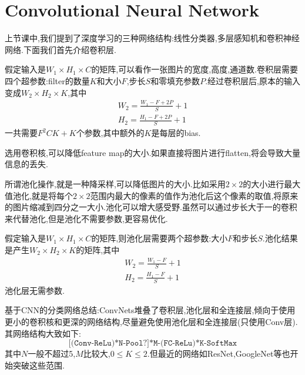 \section{Convolutional Neural Network}
上节课中,我们提到了深度学习的三种网络结构:线性分类器,多层感知机和卷积神经网络.下面我们首先介绍卷积层.

假定输入是$W_1 \times H_1 \times C$的矩阵,可以看作一张图片的宽度,高度,通道数.卷积层需要四个超参数:filter的数量$K$和大小$F$,步长$S$和零填充参数$P$.经过卷积层后,原本的输入变成$W_2 \times H_2 \times K$,其中
\begin{equation}
	\begin{split}
		W_2 = \frac{W_1 - F + 2P}{S} + 1
		\\
		H_2 = \frac{H_1 - F + 2P}{S} + 1
	\end{split}
\end{equation}
一共需要$F^2CK+K$个参数,其中额外的$K$是每层的bias.
\begin{comment}
	\begin{boxdef}{kernel和filter的区别是什么?}
		filter更多指filter layer,而kernel指卷积核这一weight matrix
	\end{boxdef}
\end{comment}


选用卷积核,可以降低feature map的大小.如果直接将图片进行flatten,将会导致大量信息的丢失.

所谓池化操作,就是一种降采样,可以降低图片的大小.比如采用$2\times 2$的大小进行最大值池化,就是将每个$2\times 2$范围内最大的像素的值作为池化后这个像素的取值,将原来的图片缩减到四分之一大小.池化可以增大感受野.虽然可以通过步长大于一的卷积来代替池化,但是池化不需要参数,更容易优化.

假定输入是$W_1 \times H_1 \times C$的矩阵,则池化层需要两个超参数:大小$F$和步长$S$.池化结果是产生$W_2 \times H_2 \times K$的矩阵,其中
\begin{equation}
	\begin{split}
		W_2 = \frac{W_1 - F}{S} + 1
		\\
		H_2 = \frac{H_1 - F}{S} + 1
	\end{split}
\end{equation}
池化层无需参数.

\begin{comment}
	\begin{figure}[htbp]
		\centering
		\begin{tikzpicture}
			\foreach \x in{0,...,4}
			{   \draw (0,\x ,4) -- (4,\x ,4);
				\draw (\x ,0,4) -- (\x ,4,4);
				\draw (4,\x ,4) -- (4,\x ,0);
				\draw (\x ,4,4) -- (\x ,4,0);
				\draw (4,0,\x ) -- (4,4,\x );
				\draw (0,4,\x ) -- (4,4,\x );
			}
		\end{tikzpicture}
		\caption{Caption}
		\label{fig:my_label}
	\end{figure}
\end{comment}
基于CNN的分类网络总结:ConvNets堆叠了卷积层,池化层和全连接层,倾向于使用更小的卷积核和更深的网络结构,尽量避免使用池化层和全连接层(只使用Conv层).其网络结构大致如下:
$$\texttt{[(Conv-ReLu)*N-Pool?]*M-(FC-ReLu)*K-SoftMax}$$
其中$N$一般不超过5,$M$比较大,$0\le K \le 2$.但最近的网络如ResNet,GoogleNet等也开始突破这些范围.

